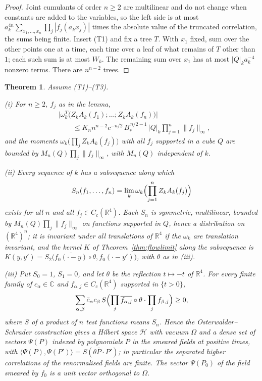 \documentclass[11pt]{amsart}
\newtheorem{theorem}{Theorem}[section]
\theoremstyle{definition}
\theoremstyle{remark}
\numberwithin{equation}{section}
\newcommand{\R}{\mathbb{R}}
\newcommand{\C}{\mathbb{C}}
\newcommand{\ip}[2]{\langle #1,#2\rangle}
\begin{document}
\begin{proof}
Joint cumulants of order $n\ge2$ are multilinear and do not change when
constants are added to the variables, so the left side is at most
$a_k^{4n}\sum_{x_1,\dots,x_n}\prod_j|f_j(a_kx_j)|$ times the absolute value
of the truncated correlation, the sums being finite. Insert (T1) and fix a
tree $T$. With $x_1$ fixed, sum over the other points one at a time, each
time over a leaf of what remains of $T$ other than $1$; each such sum is at
most $W_k$. The remaining sum over $x_1$ has at most $|Q|_ka_k^{-4}$ nonzero
terms. There are $n^{n-2}$ trees.
\end{proof}

\begin{theorem}\label{thm:higher}
Assume \textup{(T1)--(T3)}.

\textup{(i)} For $n\ge2$, $f_j$ as in the lemma,
\[
\begin{split}
&\bigl|\omega^T_k\bigl(Z_kA_k(f_1);\dots;Z_kA_k(f_n)\bigr)\bigr|\\
&\qquad\le K_nn^{n-2}c^{-n/2}\,B_*^{\,n/2-1}\,|Q|_k\prod_{j=1}^n\|f_j\|_\infty ,
\end{split}
\]
and the moments $\omega_k\bigl(\prod_jZ_kA_k(f_j)\bigr)$ with all
$f_j$ supported in a cube $Q$ are bounded by $M_n(Q)\prod_j\|f_j\|_\infty$,
with $M_n(Q)$ independent of $k$.

\textup{(ii)} Every sequence of $k$ has a subsequence along which
\[
S_n(f_1,\dots,f_n)=\lim_k\omega_k\Bigl(\prod_{j=1}^nZ_kA_k(f_j)\Bigr)
\]
exists for all $n$ and all $f_j\in C_c(\R^4)$. Each $S_n$ is symmetric,
multilinear, bounded by $M_n(Q)\prod_j\|f_j\|_\infty$ on functions supported in
$Q$, hence a distribution on $(\R^4)^n$; it is invariant under all
translations of $\R^4$ if the $\omega_k$ are translation invariant, and the
kernel $K$ of Theorem~\textup{\ref{thm:flowlimit}} along the subsequence is
$K(y,y')=S_2\bigl(\overline{f_0(\cdot-y)}\circ\theta,f_0(\cdot-y')\bigr)$, with
$\theta$ as in \textup{(iii)}.

\textup{(iii)} Put $S_0=1$, $S_1=0$, and let $\theta$ be the reflection
$t\mapsto-t$ of $\R^4$. For every finite family of $c_\alpha\in\C$ and
$f_{\alpha,j}\in C_c(\R^4)$ supported in $\{t>0\}$,
\[
\sum_{\alpha,\beta}\bar c_\alpha c_\beta\,
S\Bigl(\prod_j\overline{f_{\alpha,j}}\circ\theta\cdot\prod_jf_{\beta,j}\Bigr)\ge0,
\]
where $S$ of a product of $n$ test functions means $S_n$. Hence the
Osterwalder--Schrader construction gives a Hilbert space $\mathcal H$ with
vacuum $\Omega$ and a dense set of vectors $\Psi(P)$ indexed by polynomials $P$
in the smeared fields at positive times, with
$\ip{\Psi(P)}{\Psi(P')}=S(\theta\bar P\cdot P')$; in particular the separated
higher correlations of the renormalised fields are finite. The vector
$\Psi(P_0)$ of the field smeared by $f_0$ is a unit vector orthogonal to
$\Omega$.


\end{theorem}
\end{document}
